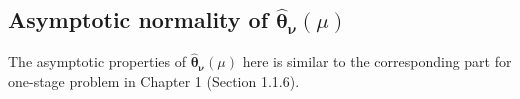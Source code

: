 \documentclass{article}
\newcommand{\wh}{\widehat}
\newcommand{\itl}{\intercal}
\newcommand{\bs}{ \boldsymbol}
\newcommand{\mb}{\mathbb}
\newcommand{\txt}{\text}
\newcommand{\lt}{\left}
\newcommand{\rt}{\right}
\begin{document}

\subsection{Asymptotic normality of $\wh{\bs{\theta}}_{\bs{\nu}}(\mu)$}
The asymptotic properties of $\wh{\bs{\theta}}_{\bs{\nu}}(\mu)$ here is similar to the corresponding part for one-stage problem in Chapter 1 (Section 1.1.6). 
\end{document}
